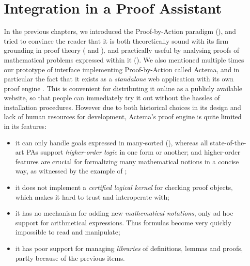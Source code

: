 \setchapterpreamble[u]{\margintoc}
\chapter{Integration in a Proof Assistant}

In the previous chapters, we introduced the Proof-by-Action paradigm
(), and tried to convince the reader that it is both theoretically
sound with its firm grounding in  proof theory ( and
), and practically useful by analysing proofs of
mathematical problems expressed within it (). We also mentioned
multiple times our prototype of interface implementing Proof-by-Action called
Actema, and in particular the fact that it exists as a \emph{standalone} web
application with its own proof engine . This is
convenient for distributing it online as a publicly available website, so that
people can immediately try it out without the hassles of installation
procedures. However due to both historical choices in its design and lack of
human resources for development, Actema's proof engine is quite limited in its
features:
\begin{itemize}
  \item it can only handle goals expressed in many-sorted 
     (), whereas all state-of-the-art PAs support
    \emph{higher-order logic} in one form or another; and higher-order features
    are crucial for formalizing many mathematical notions in a concise way, as
    witnessed by the example of ;
  \item it does not implement a \emph{certified logical kernel} for checking proof
    objects, which makes it hard to trust and interoperate with;
  \item it has no mechanism for adding new \emph{mathematical notations}, only
    ad hoc support for arithmetical expressions. Thus formulas become very
    quickly impossible to read and manipulate;
  \item it has poor support for managing \emph{libraries} of definitions, lemmas
    and proofs, partly because of the previous items.
\end{itemize}

